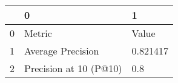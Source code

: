 \begin{tabular}{lll}
\toprule
{} &                       0 &         1 \\
\midrule
0 &                  Metric &     Value \\
1 &       Average Precision &  0.821417 \\
2 &  Precision at 10 (P@10) &       0.8 \\
\bottomrule
\end{tabular}
